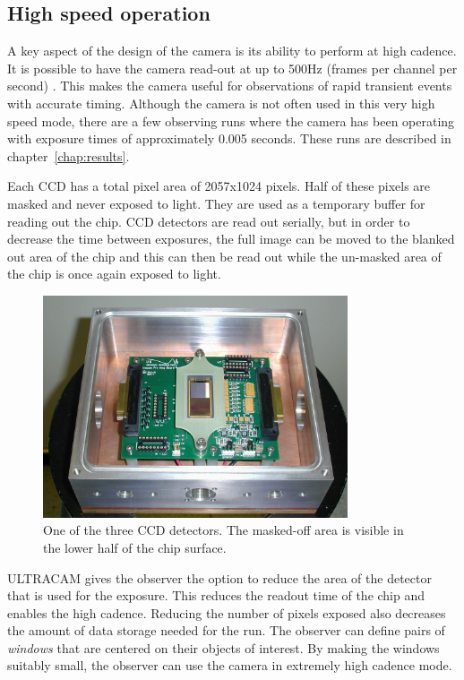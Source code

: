 \subsection{High speed operation}
A key aspect of the design of the camera is its ability to perform at high cadence. It is possible to have the camera read-out at up to 500Hz (frames per channel per second) \cite{dhillon07}. This makes the camera useful for observations of rapid transient events with accurate timing. Although the camera is not often used in this very high speed mode, there are a few observing runs where the camera has been operating with exposure times of approximately 0.005 seconds. These runs are described in chapter~\ref{chap:results}.

Each CCD has a total pixel area of 2057x1024 pixels. Half of these pixels are masked and never exposed to light. They are used as a temporary buffer for reading out the chip. CCD detectors are read out serially, but in order to decrease the time between exposures, the full image can be moved to the blanked out area of the chip and this can then be read out while the un-masked area of the chip is once again exposed to light. 

\begin{figure}[!h]
\centering
\includegraphics[width=90mm]{images/ccd.png}
\caption{One of the three CCD detectors. The masked-off area is visible in the lower half of the chip surface.}
\label{fig2}
\end{figure}

ULTRACAM gives the observer the option to reduce the area of the detector that is used for the exposure. This reduces the readout time of the chip and enables the high cadence. Reducing the number of pixels exposed also decreases the amount of data storage needed for the run. The observer can define pairs of \emph{windows} that are centered on their objects of interest. By making the windows suitably small, the observer can use the camera in extremely high cadence mode. 

